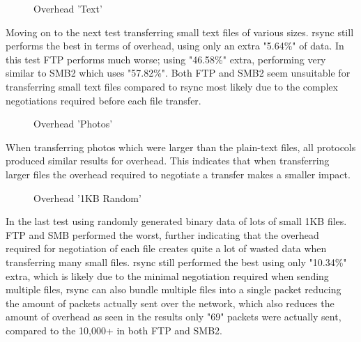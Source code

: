\begin{wrapfigure}{r}{0.3\textwidth}
    \caption{Overhead 'Text'}
\end{wrapfigure}

Moving on to the next test transferring small text files of various sizes. rsync still performs the best in terms of overhead, using only an extra "5.64\%" of data. In this test FTP performs much worse; using "46.58\%" extra, performing very similar to SMB2 which uses "57.82\%". Both FTP and SMB2 seem unsuitable for transferring small text files compared to rsync most likely due to the complex negotiations required before each file transfer.

\begin{wrapfigure}{r}{0.3\textwidth}
    \caption{Overhead 'Photos'}
\end{wrapfigure}

\newpage

When transferring photos which were larger than the plain-text files, all protocols produced similar results for overhead. This indicates that when transferring larger files the overhead required to negotiate a transfer makes a smaller impact.

\begin{wrapfigure}{r}{0.35\textwidth}
    \caption{Overhead '1KB Random'}
\end{wrapfigure}

In the last test using randomly generated binary data of lots of small 1KB files. FTP and SMB performed the worst, further indicating that the overhead required for negotiation of each file creates quite a lot of wasted data when transferring many small files. rsync still performed the best using only "10.34\%" extra, which is likely due to the minimal negotiation required when sending multiple files, rsync can also bundle multiple files into a single packet reducing the amount of packets actually sent over the network, which also reduces the amount of overhead as seen in the results only "69" packets were actually sent, compared to the 10,000+ in both FTP and SMB2.


